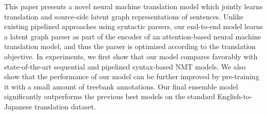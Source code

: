 This paper presents a novel neural machine translation model which jointly learns translation and source-side latent graph representations of sentences. Unlike existing pipelined approaches using syntactic parsers, our end-to-end model learns a latent graph parser as part of the encoder of an attention-based neural machine translation model, and thus the parser is optimized according to the translation objective. In experiments, we first show that our model compares favorably with state-of-the-art sequential and pipelined syntax-based NMT models. We also show that the performance of our model can be further improved by pre-training it with a small amount of treebank annotations. Our final ensemble model significantly outperforms the previous best models on the standard English-to-Japanese translation dataset.
